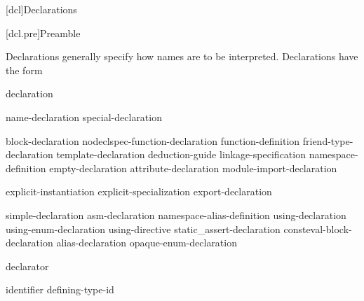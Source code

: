 [dcl]{Declarations}%



[dcl.pre]{Preamble}

\pnum
Declarations generally specify how names are to be interpreted. Declarations have
the form
\begin{bnf}
\br
    declaration 
\end{bnf}

\begin{bnf}
\br
    name-declaration\br
    special-declaration
\end{bnf}

\begin{bnf}
\br
    block-declaration\br
    nodeclspec-function-declaration\br
    function-definition\br
    friend-type-declaration\br
    template-declaration\br
    deduction-guide\br
    linkage-specification\br
    namespace-definition\br
    empty-declaration\br
    attribute-declaration\br
    module-import-declaration
\end{bnf}

\begin{bnf}
\br
    explicit-instantiation\br
    explicit-specialization\br
    export-declaration
\end{bnf}

\begin{bnf}
\br
    simple-declaration\br
    asm-declaration\br
    namespace-alias-definition\br
    using-declaration\br
    using-enum-declaration\br
    using-directive\br
    static_assert-declaration\br
    consteval-block-declaration\br
    alias-declaration\br
    opaque-enum-declaration
\end{bnf}

\begin{bnf}
\br
     declarator \terminal{;}
\end{bnf}

\begin{bnf}
\br
     identifier  \terminal{=} defining-type-id \terminal{;}
\end{bnf}

